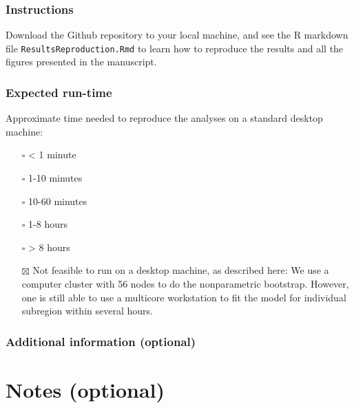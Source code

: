 \documentclass[
]{article}
\providecommand{\tightlist}{%
  \setlength{\itemsep}{0pt}\setlength{\parskip}{0pt}}
\begin{document}
\subsubsection{Instructions}\label{instructions}

Download the Github repository to your local machine, and see the R
markdown file \texttt{ResultsReproduction.Rmd} to learn how to reproduce
the results and all the figures presented in the manuscript.

\subsubsection{Expected run-time}\label{expected-run-time}

Approximate time needed to reproduce the analyses on a standard desktop
machine:

\begin{itemize}
\tightlist
\item[$\square$]
  \textless{} 1 minute
\item[$\square$]
  1-10 minutes
\item[$\square$]
  10-60 minutes
\item[$\square$]
  1-8 hours
\item[$\square$]
  \textgreater{} 8 hours
\item[$\boxtimes$]
  Not feasible to run on a desktop machine, as described here: We use a
  computer cluster with 56 nodes to do the nonparametric bootstrap.
  However, one is still able to use a multicore workstation to fit the
  model for individual subregion within several hours.
\end{itemize}

\subsubsection{Additional information
(optional)}\label{additional-information-optional-2}

\section{Notes (optional)}\label{notes-optional}
\end{document}
